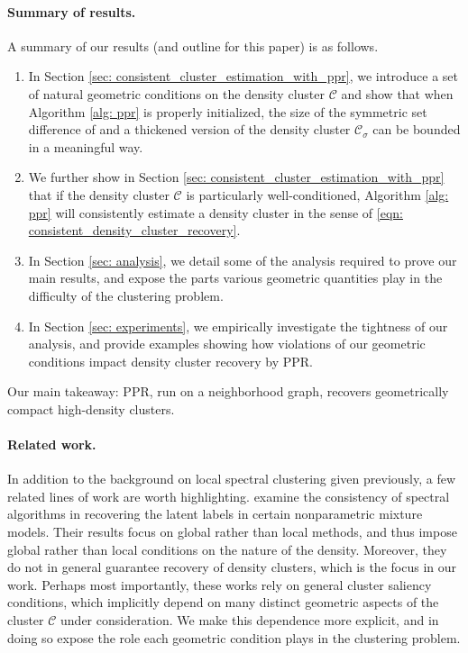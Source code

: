 \documentclass[11pt,twoside]{article}
\newcommand{\1}{\mathbf{1}}
\newcommand{\Cset}{\mathcal{C}}
\newcommand{\Csig}{\Cset_{\sigma}}
\newcommand{\Cest}{\widehat{C}}
\begin{document}
\paragraph{Summary of results.} A summary of our results (and outline for this
paper) is as follows.

\begin{enumerate}
\item In Section \ref{sec: consistent_cluster_estimation_with_ppr}, we introduce
  a set of natural geometric conditions on the density cluster $\Cset$
  and show that when Algorithm \ref{alg: ppr} is properly initialized, the size of
  the symmetric set difference of \smash{$\Cest$} and a thickened version of the
  density cluster $\Csig$ can be bounded in a meaningful way.
	
\item We further show in Section \ref{sec:
    consistent_cluster_estimation_with_ppr} that if the density cluster 
  $\Cset$ is particularly well-conditioned, Algorithm \ref{alg: ppr}
  will consistently estimate a density cluster in the sense of
  \eqref{eqn: consistent_density_cluster_recovery}. 
	
\item In Section \ref{sec: analysis}, we detail some of the analysis required to
  prove our main results, and expose the parts various geometric quantities play 
  in the difficulty of the clustering problem. 
	
\item In Section \ref{sec: experiments}, we empirically investigate the
  tightness of our analysis, and provide examples showing how violations of our
  geometric conditions impact density cluster recovery by PPR.
\end{enumerate}

Our main takeaway: PPR, run on a neighborhood graph, recovers geometrically
compact high-density clusters. 

\paragraph{Related work.} In addition to the background on local spectral
clustering given previously, a few related lines of work are worth
highlighting. \citep{shi2009,schiebinger2015} examine the consistency of  
spectral algorithms in recovering the latent labels in certain
nonparametric mixture models. Their results focus on global rather than local 
methods, and thus impose global rather than local conditions on the nature
of the density. Moreover, they do not in general guarantee recovery of density 
clusters, which is the focus in our work. Perhaps most importantly, these works
rely on general cluster saliency conditions, which implicitly depend on many
distinct geometric aspects of the cluster $\Cset$ under consideration. We make
this dependence more explicit, and in doing so expose the role each geometric
condition plays in the clustering problem. 
\end{document}

